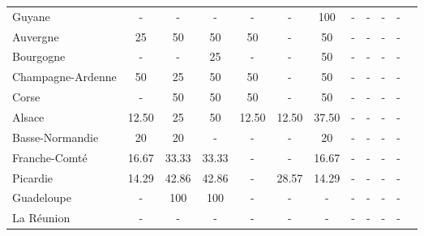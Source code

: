 \begin{table}[H]
\begin{tabularx}{\textwidth}{Xccccccccccc}
            Guyane & - & - & - & - & - & 100 & - & - & - & - \\
            Auvergne & 25 & 50 & 50 & 50 & - & 50 & - & - & - & - \\
            Bourgogne & - & - & 25 & - & - & 50 & - & - & - & - \\
            Champagne-Ardenne & 50 & 25 & 50 & 50 & - & 50 & - & - & - & - \\
            Corse & - & 50 & 50 & 50 & - & 50 & - & - & - & - \\
            Alsace & 12.50 & 25 & 50 & 12.50 & 12.50 & 37.50 & - & - & - & - \\
            Basse-Normandie  & 20 & 20 & - & - & - & 20 & - & - & - & - \\
            Franche-Comté & 16.67 & 33.33 & 33.33 & - & - & 16.67 & - & - & - & - \\
            Picardie & 14.29 & 42.86 & 42.86 & - & 28.57 & 14.29 & - & - & - & - \\
            Guadeloupe & - & 100 & 100 & - & - & - & - & - & - & - \\
            La Réunion  & - & - & - & - & - & - & - & - & - & - \\
        \bottomrule
    \end{tabularx}
\end{table}
    